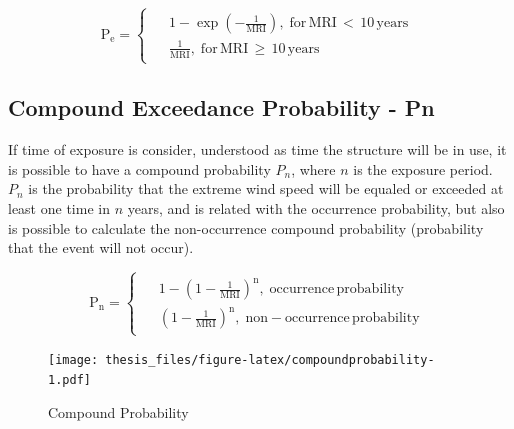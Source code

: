 \documentclass[12pt,oneside]{reedthesis}
\begin{document}
\[
  \mathrm{
    P_e = 
    \begin{cases}
      \begin{split}
            &1-\exp\left(-\frac{1}{MRI}\right),\;for\,MRI\,<\,10\,years
            \\
            &\frac{1}{MRI},\;for\,MRI\,\geq\,10\,years      
      \end{split}
    \end{cases}
  }
\]

\hypertarget{compound-exceedance-probability---pn}{%
\subsection{Compound Exceedance Probability - Pn}\label{compound-exceedance-probability---pn}}

If time of exposure is consider, understood as time the structure will be in use, it is possible to have a compound probability \(P_n\), where \(n\) is the exposure period. \(P_n\) is the probability that the extreme wind speed will be equaled or exceeded at least one time in \(n\) years, and is related with the occurrence probability, but also is possible to calculate the non-occurrence compound probability (probability that the event will not occur).

\[
  \mathrm{
    P_n = 
    \begin{cases}
      \begin{split}
            &1-\left(1-\frac{1}{MRI}\right)^n,\;occurrence\,probability
            \\
            &\left(1-\frac{1}{MRI}\right)^n,\;non-occurrence\,probability
      \end{split}
    \end{cases}
  }
\]

\footnotesize
\begin{figure}
\centering
\texttt{[image: thesis\_files/figure-latex/compoundprobability-1.pdf]}
\caption{\label{fig:compoundprobability}Compound Probability}
\end{figure}
\normalsize
\end{document}
